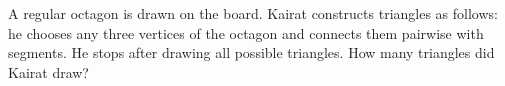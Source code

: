 A regular octagon is drawn on the board. Kairat constructs triangles as follows: he chooses any three vertices of the octagon and connects them pairwise with segments. He stops after drawing all possible triangles. How many triangles did Kairat draw?
